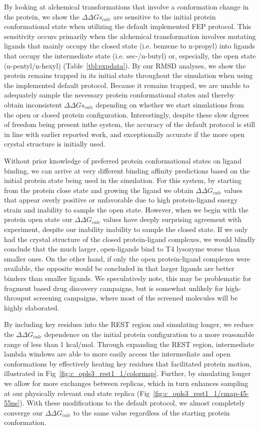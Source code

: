 \documentclass[journal=jctcce,manuscript=article]{achemso}
\begin{document}
By looking at alchemical transformations that involve a conformation change in the protein, we show the $\Delta\Delta Gs_{calc}$ are sensitive to the initial protein conformational state when utilizing the default implemented FEP protocol.
This sensitivity occurs primarily when the alchemical transformation involves mutating ligands that mainly occupy the closed state (i.e. benzene to n-propyl) into ligands that occupy the intermediate state (i.e. sec-/n-butyl) or, especially, the open state (n-pentyl/n-hexyl) (Table~\ref{tbl:expdata}).
By our RMSD analyses, we show the protein remains trapped in its initial state throughout the simulation when using the implemented default protocol.
Because it remains trapped, we are unable to adequately sample the necessary protein conformational states and thereby obtain inconsistent $\Delta\Delta Gs_{calc}$ depending on whether we start simulations from the open or closed protein configuration.  
Interestingly, despite these slow dgrees of freedom being present inthe system, the accuracy of the default protocol is still in line with earlier reported work, and exceptionally accurate if the more open crystal structure is initially used.

Without prior knowledge of preferred protein conformational states on ligand binding, we can arrive at very different binding affinity predictions based on the initial protein state being used in the simulation.
For this system, by starting from the protein close state and growing the ligand we obtain $\Delta\Delta G_{calc}$ values that appear overly positive or unfavorable due to high protein-ligand energy strain and inability to sample the open state. 
However, when we begin with the protein open state our $\Delta\Delta G_{calc}$ values have deeply surprising agreement with experiment, despite our inability inability to sample the closed state.
If we only had the crystal structure of the closed protein-ligand complexes, we would blindly conclude that the much larger, open-ligands bind to T4 lysozyme worse than smaller ones.
On the other hand, if only the open protein-ligand complexes were available, the opposite would be concluded in that larger ligands are better binders than smaller ligands.
We speculatively note, this may be problematic for fragment based drug discovery campaigns, but is somewhat unlikely for high-throuput screening campaigns, where most of the screened molecules will be highly elaborated.

By including key residues into the REST region and simulating longer, we reduce the $\Delta\Delta G_{calc}$ dependence on the initial protein configuration to a more reasonable range of less than 1 kcal/mol.
Through expanding the REST region, intermediate lambda windows are able to more easily access the intermediate and open conformations by effectively heating key residues that facilitated protein motion, illustrated in Fig~\ref{fig:c_opls3_rest1_1/colormap}.
Further, by simulating longer we allow for more exchanges between replicas, which in turn enhances sampling at our physically relevant end state replica (Fig~\ref{fig:c_opls3_rest1_1/cmap-45-55ns}).   
With these modifications to the default protocol, we almost completely converge our $\Delta\Delta G_{calc}$ to the same value regardless of the starting protein conformation.
\end{document}
